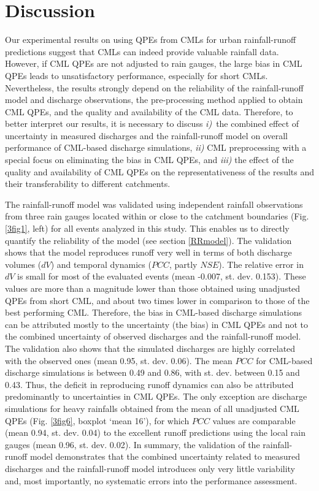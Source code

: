 \documentclass{ctuthesis}\usepackage[]{graphicx}\usepackage[]{color}
\begin{document}
\section{Discussion}

Our experimental results on using QPEs from CMLs for urban rainfall-runoff predictions suggest that CMLs can indeed provide valuable rainfall data. However, if CML QPEs are not adjusted to rain gauges, the large bias in CML QPEs leads to unsatisfactory performance, especially for short CMLs. Nevertheless, the results strongly depend on the reliability of the rainfall-runoff model and discharge observations, the pre-processing method applied to obtain CML QPEs, and the quality and availability of the CML data. Therefore, to better interpret our results, it is necessary to discuss \emph{i)}~the combined effect of uncertainty in measured discharges and the rainfall-runoff model on overall performance of CML-based discharge simulations, \emph{ii)} CML preprocessing with a special focus on eliminating the bias in CML QPEs, and \emph{iii)} the effect of the quality and availability of CML QPEs on the representativeness of the results and their transferability to different catchments.

The rainfall-runoff model was validated using independent rainfall observations from three rain gauges located within or close to the catchment boundaries (Fig. \ref{3fig1}, left) for all events analyzed in this study. This enables us to directly quantify the reliability of the model (see section \ref{RRmodel}). The validation shows that the model reproduces runoff very well in terms of both discharge volumes ($dV$) and temporal dynamics ($PCC$, partly $NSE$). The relative error in $dV$ is small for most of the evaluated events (mean -0.007, st. dev. 0.153). These values are more than a magnitude lower than those obtained using unadjusted QPEs from short CML, and about two times lower in comparison to those of the best performing CML. Therefore, the bias in CML-based discharge simulations can be attributed mostly to the uncertainty (the bias) in CML QPEs and not to the combined uncertainty of observed discharges and the rainfall-runoff model. The validation also shows that the simulated discharges are highly correlated with the observed ones (mean 0.95, st. dev. 0.06). The mean $PCC$ for CML-based discharge simulations is between 0.49 and 0.86, with st. dev. between 0.15 and 0.43. Thus, the deficit in reproducing runoff dynamics can also be attributed predominantly to uncertainties in CML QPEs. The only exception are discharge simulations for heavy rainfalls obtained from the mean of all unadjusted CML QPEs (Fig. \ref{3fig6}, boxplot ‘mean 16’), for which $PCC$ values are comparable (mean 0.94, st. dev. 0.04) to the excellent runoff predictions using the local rain gauges (mean 0.96, st. dev. 0.02). In summary, the validation of the rainfall-runoff model demonstrates that the combined uncertainty related to measured discharges and the rainfall-runoff model introduces only very little variability and, most importantly, no systematic errors into the performance assessment.
\end{document}
